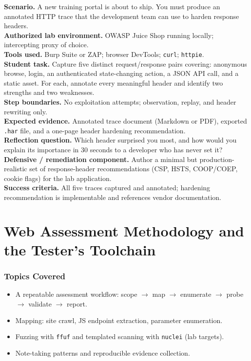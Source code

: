 \documentclass[11pt,letterpaper,oneside]{report}
\newcommand{\tool}[1]{\texttt{\small #1}}
\begin{document}
\begin{labbox}
\textbf{Scenario.} A new training portal is about to ship. You must produce an annotated HTTP trace that the development team can use to harden response headers.\\[3pt]
\textbf{Authorized lab environment.} OWASP Juice Shop running locally; intercepting proxy of choice.\\[3pt]
\textbf{Tools used.} Burp Suite or ZAP; browser DevTools; \tool{curl}; \tool{httpie}.\\[3pt]
\textbf{Student task.} Capture five distinct request/response pairs covering: anonymous browse, login, an authenticated state-changing action, a JSON API call, and a static asset. For each, annotate every meaningful header and identify two strengths and two weaknesses.\\[3pt]
\textbf{Step boundaries.} No exploitation attempts; observation, replay, and header rewriting only.\\[3pt]
\textbf{Expected evidence.} Annotated trace document (Markdown or PDF), exported \tool{.har} file, and a one-page header hardening recommendation.\\[3pt]
\textbf{Reflection question.} Which header surprised you most, and how would you explain its importance in 30 seconds to a developer who has never set it?\\[3pt]
\textbf{Defensive / remediation component.} Author a minimal but production-realistic set of response-header recommendations (CSP, HSTS, COOP/COEP, cookie flags) for the lab application.\\[3pt]
\textbf{Success criteria.} All five traces captured and annotated; hardening recommendation is implementable and references vendor documentation.
\end{labbox}

\chapter{Web Assessment Methodology and the Tester's Toolchain}

\subsection*{Topics Covered}
\begin{itemize}
  \item A repeatable assessment workflow: scope $\to$ map $\to$ enumerate $\to$ probe $\to$ validate $\to$ report.
  \item Mapping: site crawl, JS endpoint extraction, parameter enumeration.
  \item Fuzzing with \tool{ffuf} and templated scanning with \tool{nuclei} (lab targets).
  \item Note-taking patterns and reproducible evidence collection.
\end{itemize}
\end{document}
